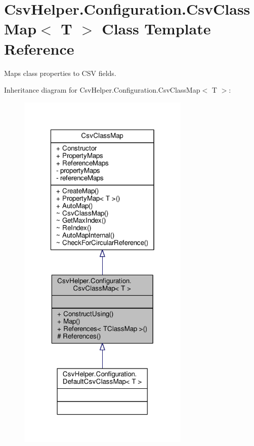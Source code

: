 \hypertarget{a00041}{\section{Csv\-Helper.\-Configuration.\-Csv\-Class\-Map$<$ T $>$ Class Template Reference}
\label{a00041}
}


Maps class properties to C\-S\-V fields.  




Inheritance diagram for Csv\-Helper.\-Configuration.\-Csv\-Class\-Map$<$ T $>$\-:
\nopagebreak
\begin{figure}[H]
\begin{center}
\leavevmode
\includegraphics[width=232pt]{d1/d98/a00407}
\end{center}
\end{figure}


